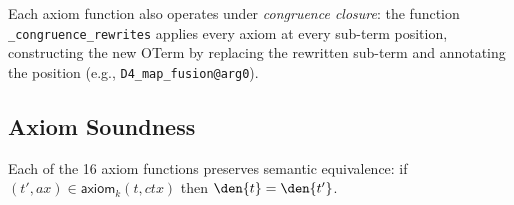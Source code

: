 Each axiom function also operates under \emph{congruence closure}:
the function \texttt{\_congruence\_rewrites} applies every axiom
at every sub-term position, constructing the new OTerm by replacing
the rewritten sub-term and annotating the position (e.g.,
\texttt{D4\_map\_fusion@arg0}).

\subsection{Axiom Soundness}

\begin{theorem}
\label{thm:axiom-soundness}
Each of the 16 axiom functions preserves semantic equivalence:
if $(t', \mathit{ax}) \in \mathsf{axiom}_k(t, \mathit{ctx})$
then $\den{t} = \den{t'}$.
\end{theorem}

